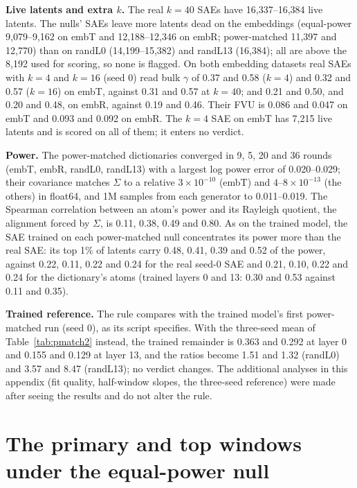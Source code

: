 \documentclass[10pt,twocolumn]{article}
\newcommand{\Sig}{\Sigma}
\begin{document}
\textbf{Live latents and extra $k$.} The real $k=40$ SAEs have 16,337--16,384 live latents. The nulls' SAEs leave more latents dead on the embeddings (equal-power 9,079--9,162 on embT and 12,188--12,346 on embR; power-matched 11,397 and 12,770) than on randL0 (14,199--15,382) and randL13 (16,384); all are above the 8,192 used for scoring, so none is flagged. On both embedding datasets real SAEs with $k=4$ and $k=16$ (seed 0) read bulk $\gamma$ of 0.37 and 0.58 ($k=4$) and 0.32 and 0.57 ($k=16$) on embT, against 0.31 and 0.57 at $k=40$; and 0.21 and 0.50, and 0.20 and 0.48, on embR, against 0.19 and 0.46. Their FVU is 0.086 and 0.047 on embT and 0.093 and 0.092 on embR. The $k=4$ SAE on embT has 7,215 live latents and is scored on all of them; it enters no verdict.

\textbf{Power.} The power-matched dictionaries converged in 9, 5, 20 and 36 rounds (embT, embR, randL0, randL13) with a largest log power error of 0.020--0.029; their covariance matches $\Sig$ to a relative $3\times10^{-10}$ (embT) and $4$--$8\times10^{-13}$ (the others) in float64, and 1M samples from each generator to 0.011--0.019. The Spearman correlation between an atom's power and its Rayleigh quotient, the alignment forced by $\Sig$, is 0.11, 0.38, 0.49 and 0.80. As on the trained model, the SAE trained on each power-matched null concentrates its power more than the real SAE: its top 1\% of latents carry 0.48, 0.41, 0.39 and 0.52 of the power, against 0.22, 0.11, 0.22 and 0.24 for the real seed-0 SAE and 0.21, 0.10, 0.22 and 0.24 for the dictionary's atoms (trained layers 0 and 13: 0.30 and 0.53 against 0.11 and 0.35).

\textbf{Trained reference.} The rule compares with the trained model's first power-matched run (seed 0), as its script specifies. With the three-seed mean of Table~\ref{tab:pmatch2} instead, the trained remainder is 0.363 and 0.292 at layer 0 and 0.155 and 0.129 at layer 13, and the ratios become 1.51 and 1.32 (randL0) and 3.57 and 8.47 (randL13); no verdict changes. The additional analyses in this appendix (fit quality, half-window slopes, the three-seed reference) were made after seeing the results and do not alter the rule.

\section{The primary and top windows under the equal-power null}
\label{app:primary}

\begin{table}[!htb]
\centering
\caption{Real and equal-power null SAEs at eight layers of Gemma-2-2B in the reference setting ($k=40$, width 16,384; real three seeds, null two). $\rho$ is the null's dense share. Each $\gamma$ is a seed mean. The interval is a 90\% Welch interval from the seed spread, with 1.0--2.5 degrees of freedom. It lies inside $\pm 0.06$, a margin chosen after seeing the data, at layers 9, 13 and 17, and excludes zero at every layer but 17. The null's own dictionary has $\gamma=0.986$--1.000 in every window.}
\label{tab:matched}
\small

\end{table}
\end{document}
